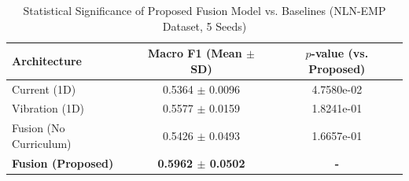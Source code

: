 \begin{table}[h]
\centering
\caption{Statistical Significance of Proposed Fusion Model vs. Baselines (NLN-EMP Dataset, 5 Seeds)}
\label{tab:statistical_significance}
\begin{tabular}{lcc}
\hline
\textbf{Architecture} & \textbf{Macro F1 (Mean $\pm$ SD)} & \textbf{$p$-value (vs. Proposed)} \\
\hline
Current (1D) & 0.5364 $\pm$ 0.0096 & 4.7580e-02 \\
Vibration (1D) & 0.5577 $\pm$ 0.0159 & 1.8241e-01 \\
Fusion (No Curriculum) & 0.5426 $\pm$ 0.0493 & 1.6657e-01 \\
\textbf{Fusion (Proposed)} & \textbf{0.5962 $\pm$ 0.0502} & \textbf{-} \\
\hline
\end{tabular}
\end{table}
